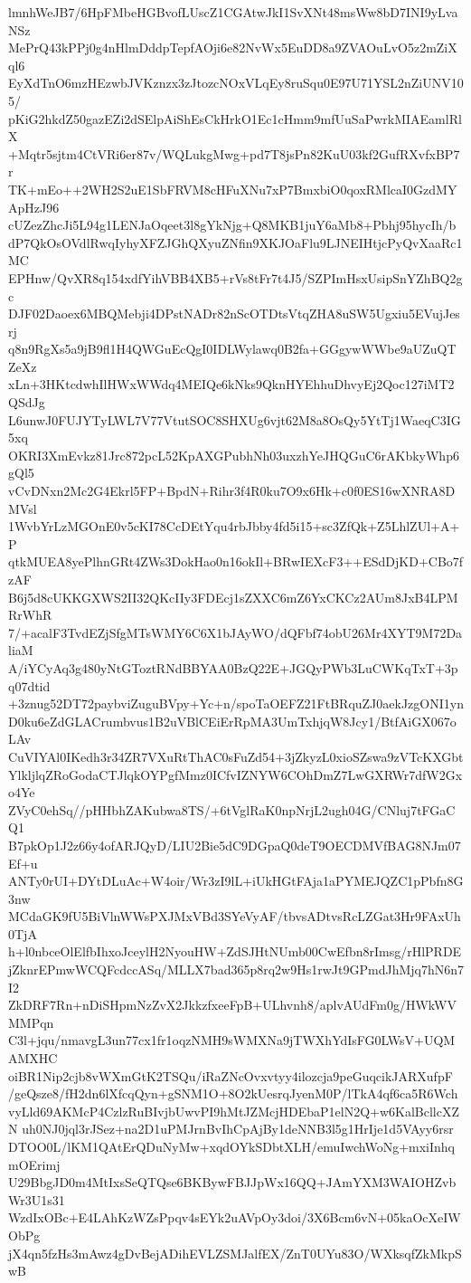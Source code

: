 lmnhWeJB7/6HpFMbeHGBvofLUscZ1CGAtwJkI1SvXNt48msWw8bD7INI9yLvaNSz
MePrQ43kPPj0g4nHlmDddpTepfAOji6e82NvWx5EuDD8a9ZVAOuLvO5z2mZiXql6
EyXdTnO6mzHEzwbJVKznzx3zJtozcNOxVLqEy8ruSqu0E97U71YSL2nZiUNV105/
pKiG2hkdZ50gazEZi2dSElpAiShEsCkHrkO1Ec1cHmm9mfUuSaPwrkMIAEamlRlX
+Mqtr5sjtm4CtVRi6er87v/WQLukgMwg+pd7T8jsPn82KuU03kf2GufRXvfxBP7r
TK+mEo++2WH2S2uE1SbFRVM8cHFuXNu7xP7BmxbiO0qoxRMlcaI0GzdMYApHzJ96
cUZezZhcJi5L94g1LENJaOqeet3l8gYkNjg+Q8MKB1juY6aMb8+Pbhj95hycIh/b
dP7QkOsOVdlRwqIyhyXFZJGhQXyuZNfin9XKJOaFlu9LJNEIHtjcPyQvXaaRc1MC
EPHnw/QvXR8q154xdfYihVBB4XB5+rVs8tFr7t4J5/SZPImHsxUsipSnYZhBQ2gc
DJF02Daoex6MBQMebji4DPstNADr82nScOTDtsVtqZHA8uSW5Ugxiu5EVujJesrj
q8n9RgXs5a9jB9fl1H4QWGuEcQgI0IDLWylawq0B2fa+GGgywWWbe9aUZuQTZeXz
xLn+3HKtcdwhIlHWxWWdq4MEIQe6kNks9QknHYEhhuDhvyEj2Qoc127iMT2QSdJg
L6unwJ0FUJYTyLWL7V77VtutSOC8SHXUg6vjt62M8a8OsQy5YtTj1WaeqC3IG5xq
OKRI3XmEvkz81Jrc872pcL52KpAXGPubhNh03uxzhYeJHQGuC6rAKbkyWhp6gQl5
vCvDNxn2Mc2G4Ekrl5FP+BpdN+Rihr3f4R0ku7O9x6Hk+c0f0ES16wXNRA8DMVsl
1WvbYrLzMGOnE0v5cKI78CcDEtYqu4rbJbby4fd5i15+sc3ZfQk+Z5LhlZUl+A+P
qtkMUEA8yePlhnGRt4ZWs3DokHao0n16okIl+BRwIEXcF3++ESdDjKD+CBo7fzAF
B6j5d8cUKKGXWS2II32QKcIIy3FDEcj1sZXXC6mZ6YxCKCz2AUm8JxB4LPMRrWhR
7/+acalF3TvdEZjSfgMTsWMY6C6X1bJAyWO/dQFbf74obU26Mr4XYT9M72DaliaM
A/iYCyAq3g480yNtGToztRNdBBYAA0BzQ22E+JGQyPWb3LuCWKqTxT+3pq07dtid
+3znug52DT72paybviZuguBVpy+Yc+n/spoTaOEFZ21FtBRquZJ0aekJzgONI1yn
D0ku6eZdGLACrumbvus1B2uVBlCEiErRpMA3UmTxhjqW8Jcy1/BtfAiGX067oLAv
CuVIYAl0IKedh3r34ZR7VXuRtThAC0sFuZd54+3jZkyzL0xioSZswa9zVTcKXGbt
YlkljlqZRoGodaCTJlqkOYPgfMmz0ICfvIZNYW6COhDmZ7LwGXRWr7dfW2Gxo4Ye
ZVyC0ehSq//pHHbhZAKubwa8TS/+6tVglRaK0npNrjL2ugh04G/CNluj7tFGaCQ1
B7pkOp1J2z66y4ofARJQyD/LIU2Bie5dC9DGpaQ0deT9OECDMVfBAG8NJm07Ef+u
ANTy0rUI+DYtDLuAc+W4oir/Wr3zI9lL+iUkHGtFAja1aPYMEJQZC1pPbfn8G3nw
MCdaGK9fU5BiVlnWWsPXJMxVBd3SYeVyAF/tbvsADtvsRcLZGat3Hr9FAxUh0TjA
h+l0nbceOlElfbIhxoJceylH2NyouHW+ZdSJHtNUmb00CwEfbn8rImsg/rHlPRDE
jZknrEPmwWCQFcdccASq/MLLX7bad365p8rq2w9Hs1rwJt9GPmdJhMjq7hN6n7I2
ZkDRF7Rn+nDiSHpmNzZvX2JkkzfxeeFpB+ULhvnh8/aplvAUdFm0g/HWkWVMMPqn
C3l+jqu/nmavgL3un77cx1fr1oqzNMH9sWMXNa9jTWXhYdIsFG0LWsV+UQMAMXHC
oiBR1Nip2cjb8vWXmGtK2TSQu/iRaZNcOvxvtyy4ilozcja9peGuqcikJARXufpF
/geQsze8/fH2dn6lXfcqQyn+gSNM1O+8O2kUesrqJyenM0P/lTkA4qf6ca5R6Wch
vyLld69AKMcP4CzlzRuBIvjbUwvPI9hMtJZMcjHDEbaP1elN2Q+w6KalBcllcXZN
uh0NJ0jql3rJSez+na2D1uPMJrnBvIhCpAjBy1deNNB3l5g1HrIje1d5VAyy6rsr
DTOO0L/lKM1QAtErQDuNyMw+xqdOYkSDbtXLH/emuIwchWoNg+mxiInhqmOErimj
U29BbgJD0m4MtIxsSeQTQse6BKBywFBJJpWx16QQ+JAmYXM3WAIOHZvbWr3U1s31
WzdIxOBc+E4LAhKzWZsPpqv4sEYk2uAVpOy3doi/3X6Bcm6vN+05kaOcXeIWObPg
jX4qn5fzHs3mAwz4gDvBejADihEVLZSMJalfEX/ZnT0UYu83O/WXksqfZkMkpSwB
